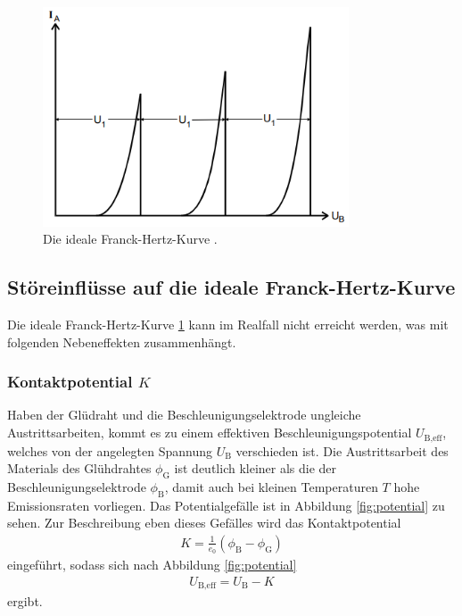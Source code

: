 \begin{figure}[H]
    \centering
    \includegraphics[height = 6.5cm]{bilder/franck-hertz-ideal.png}
    \caption{Die ideale Franck-Hertz-Kurve \cite{man:v601}.}
    \label{fig:f-h-ideal}
\end{figure}
\noindent

\subsection{Störeinflüsse auf die ideale Franck-Hertz-Kurve}
Die ideale Franck-Hertz-Kurve \ref{fig:f-h-ideal} kann im Realfall nicht erreicht werden, was mit folgenden Nebeneffekten zusammenhängt.

\subsubsection{Kontaktpotential $K$}
Haben der Glüdraht und die Beschleunigungselektrode ungleiche Austrittsarbeiten, kommt es zu einem effektiven Beschleunigungspotential $U_\text{B,eff}$,
welches von der angelegten Spannung $U_\text{B}$ verschieden ist.
Die Austrittsarbeit des Materials des Glühdrahtes $\phi_\text{G}$ ist deutlich kleiner als die der Beschleunigungselektrode $\phi_\text{B}$,
damit auch bei kleinen Temperaturen $T$ hohe Emissionsraten vorliegen.
Das Potentialgefälle ist in Abbildung \ref{fig:potential} zu sehen.
Zur Beschreibung eben dieses Gefälles wird das Kontaktpotential 
\begin{align}
    K = \frac{1}{e_0} \left(\phi_\text{B}- \phi_\text{G}\right)
    \label{eq:kontaktpotential}
\end{align}
eingeführt, sodass sich nach Abbildung \ref{fig:potential} 
\begin{align}
    U_\text{B,eff} = U_\text{B} - K
    \label{eq:u-b-eff}
\end{align}
ergibt.

